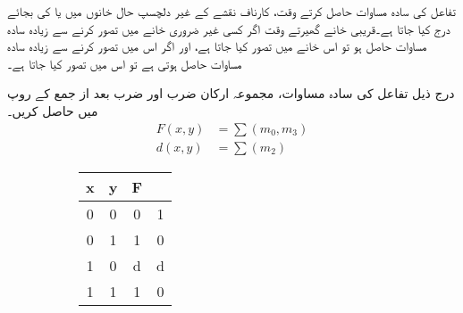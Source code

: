 تفاعل کی سادہ مساوات حاصل کرتے وقت، کارناف نقشے کے غیر دلچسپ حال خانوں میں  یا  کی بجائے  درج کیا جاتا ہے۔قریبی خانے گھیرتے وقت اگر کسی غیر ضروری خانے میں  تصور کرنے سے زیادہ سادہ مساوات حاصل ہو تو اس خانے میں  تصور کیا جاتا ہے، اور اگر اس میں  تصور کرنے سے زیادہ سادہ مساوات حاصل ہوتی ہے تو اس میں  تصور کیا جاتا ہے۔


درج ذیل تفاعل کی سادہ مساوات، مجموعہ ارکان ضرب اور  ضرب بعد از جمع کے روپ میں حاصل کریں۔
\begin{align*}
F(x,y)&=\sum (m_0,m_3)\\
d(x,y)&=\sum (m_2)
\end{align*}
%
\begin{figure}
\centering
\begin{subfigure}{0.33\textwidth}
\centering
\begin{otherlanguage}{english}
\begin{tabular}{CC|CC}
\toprule
x&y&F&\\
&0&0&1\\
0&1&1&0\\
1&0&d&d\\
1&1&1&0\\
\bottomrule
\end{tabular}
\end{otherlanguage}
\caption{}
\end{subfigure}\hfill
\begin{subfigure}{0.33\textwidth}
\centering
{}
\end{subfigure}
\end{figure}
